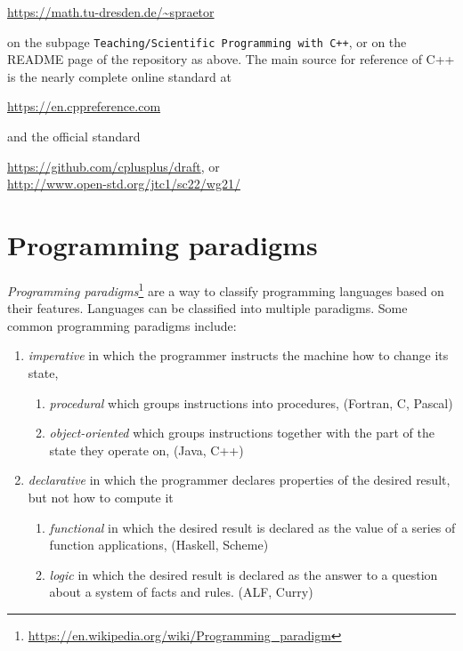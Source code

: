 \url{https://math.tu-dresden.de/~spraetor}

on the subpage \texttt{Teaching/Scientific Programming with C++}, or on the README page of the repository as above. The main source for reference of C++ is the nearly complete online standard at

\url{https://en.cppreference.com}

and the official standard

\url{https://github.com/cplusplus/draft}, or \\
\url{http://www.open-std.org/jtc1/sc22/wg21/}


\section{Programming paradigms}
\emph{Programming paradigms}\footnote{\url{https://en.wikipedia.org/wiki/Programming_paradigm}} are a way to classify programming languages
based on their features. Languages can be classified into multiple paradigms. Some common programming paradigms include:
\begin{enumerate}
  \item \emph{imperative} in which the programmer instructs the machine how to change its state,
    \begin{enumerate}
      \item \emph{procedural} which groups instructions into procedures, (Fortran, C, Pascal)
      \item \emph{object-oriented} which groups instructions together with the part of the state they operate on, (Java, C++)
    \end{enumerate}
  \item \emph{declarative} in which the programmer declares properties of the desired result, but not how to compute it
    \begin{enumerate}
      \item \emph{functional} in which the desired result is declared as the value of a series of function applications, (Haskell, Scheme)
      \item \emph{logic} in which the desired result is declared as the answer to a question about a system of facts and rules. (ALF, Curry)
    \end{enumerate}
\end{enumerate}

